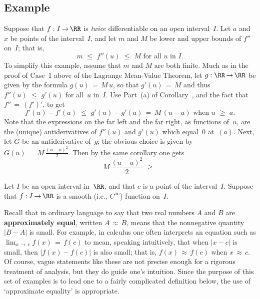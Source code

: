 {\VV

            \subsection{\small{\bf Example}}
            \label{ExampE60.10}

\V

        Suppose that $f:I \,{\rightarrow}\, {\RR}$ is {\em twice} differentiable on an open interval~$I$.
    Let $a$ and $x$ be points of the interval~$I$, and let $m$ and $M$ be lower and upper bounds of $f''$ on~$I$; that is,
        \begin{displaymath}
        m\,\,{\leq}\,\,f''(u)\,\,{\leq}\,\,M \mbox{ for all $u$ in~$I$}.
        \end{displaymath}
    To simplify this example, assume that $m$ and $M$ are both finite. Much as in the proof of Case~1 above of the Lagrange Mean-Value Theorem,
    let $g:{\RR} \,{\rightarrow}\, {\RR}$ be given by the formula $g(u) \,=\, M\,u$,
    so that $g'(u) \,=\, M$ and thus $f''(u)\,\,{\leq}\,\,g'(u)$ for all~$u$ in~$I$.
    Use Part~(a) of Corollary~, and the fact that $f'' \,=\, (f')'$, to get
        \begin{displaymath}
        f'(u) - f'(a)\,\,{\leq}\,\,g'(u) - g'(a) \,=\, M\,(u-a) \mbox{ when $u\,\,{\geq}\,\,a$}.
        \end{displaymath}
    Note that the expressions on the far left and the far right, as functions of~$u$,
    are the (unique) antiderivatives of $f''(u)$ and $g'(u)$ which equal~$0$ at~$(a)$.
    Next, let $G$ be an antiderivative of~$g$; the obvious choice is given by $G(u) \,=\, {\displaystyle M\,\frac{(u-a)^{2}}{2}}$.
    Then by the same corollary one gets
        \begin{displaymath}
        M\,\frac{(u-a)^{2}}{2}\,\,{\geq}\,\,
        \end{displaymath}
    


        Let $I$ be an open interval in~${\RR}$, and that $c$ is a point of the interval~$I$.
    Suppose that $f:I \,{\rightarrow}\, {\RR}$ is a smooth (i.e., $C^{{\infty}}$) function on~$I$.

        Recall that in ordinary language to say that two real numbers $A$ and $B$ are {\bf approximately equal}, written $A \,{\approx}\, B$,
    means that the nonnegative quantity $|B-A|$ is small. For example, in calculus one often interprets an equation such as $\lim_{x \,{\rightarrow}\, c} f(x) \,=\, f(c)$ to mean,
    speaking intuitively, that when $|x-c|$ is small, then $|f(x)-f(c)|$ is also small; that is, $f(x) \,{\approx}\, f(c)$ when $x \,{\approx}\, c$.
    Of course, vague statements like these are not precise enough for a rigorous treatment of analysis, but they do guide one's intuition.
    Since the purpose of this set of examples is to lead one to a fairly complicated definition below, the use of `approximate equality' is appropriate.

}
